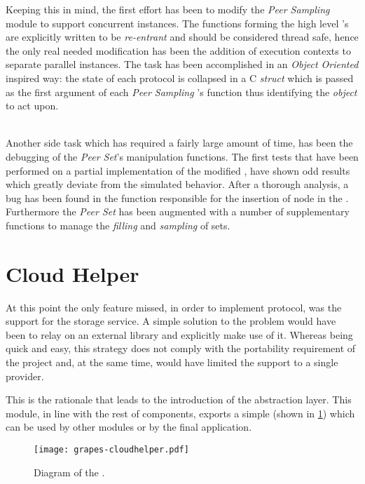 Keeping this in mind, the first effort has been to modify the
\emph{Peer Sampling} module to support concurrent instances. The
functions forming the high level \grapes's \api are explicitly written
to be \emph{re-entrant} and should be considered thread safe, hence the only
real needed modification has been the addition of execution contexts to
separate parallel instances. The task has been accomplished in an
\emph{Object Oriented} inspired way: the state of each protocol is
collapsed in a C \emph{struct} which is passed as the first
argument of each \textit{Peer Sampling} \api's function thus identifying
the \emph{object} to act upon.

\ \\
Another side task which has required a fairly large amount of time, has
been the debugging of the \textit{Peer Set}'s manipulation functions. The
first tests that have been performed on a partial implementation of
the modified
\cyclon, have shown odd results which greatly deviate from the simulated
behavior. After a thorough analysis, a bug has been found in the function
responsible for the insertion of node \descriptors in the \view.
Furthermore the \textit{Peer Set} \api has been augmented with a number of
supplementary functions to manage the \emph{filling} and
\emph{sampling} of sets.

\section{Cloud Helper}
At this point the only feature \grapes missed, in order to implement
\cloudcast \peersampling protocol, was the support for the storage
service. A simple solution to the problem would have been to
relay on an external library and explicitly make use of it. Whereas
being quick and easy, this strategy does not comply with the
portability requirement of the project and, at the same time, would have
limited the \cloud support to a single provider.

This is the rationale that leads to the introduction of the
\cloudhelper abstraction layer. This module, in line with the rest of
\grapes components, exports a simple \api (shown in
\ref{fig:grapes-cloudhelper}) which can be used by other
modules or by the final application.

\begin{figure}[H]
  \centering
  \texttt{[image: grapes-cloudhelper.pdf]}
  \caption{Diagram of the \cloudhelper \api.}
  \label{fig:grapes-cloudhelper}
\end{figure}

